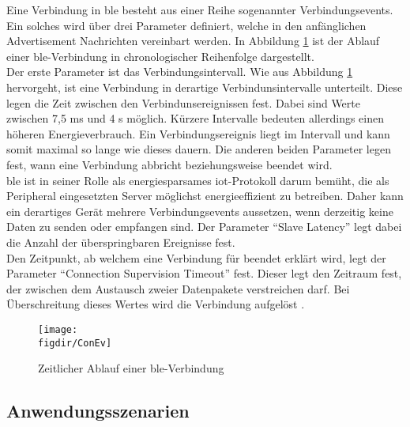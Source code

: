 \noindent Eine Verbindung in \ac{ble} besteht aus einer Reihe sogenannter Verbindungsevents. Ein solches wird über drei Parameter definiert, welche in den anfänglichen Advertisement Nachrichten vereinbart werden. In Abbildung \ref{FIG:ConEv} ist der Ablauf einer \ac{ble}-Verbindung in chronologischer Reihenfolge dargestellt.\\
\noindent Der erste Parameter ist das Verbindungsintervall. Wie aus Abbildung \ref{FIG:ConEv} hervorgeht, ist eine Verbindung in derartige Verbindunsintervalle unterteilt. Diese legen die Zeit zwischen den Verbindunsereignissen fest. Dabei sind Werte zwischen 7,5 ms und 4 s möglich. Kürzere Intervalle bedeuten allerdings einen höheren Energieverbrauch. Ein Verbindungsereignis liegt im Intervall und kann somit maximal so lange wie dieses dauern. Die anderen beiden Parameter legen fest, wann eine Verbindung abbricht beziehungsweise beendet wird.\\ 
\noindent \ac{ble} ist in seiner Rolle als energiesparsames \ac{iot}-Protokoll darum bemüht, die als Peripheral eingesetzten Server möglichst energieeffizient zu betreiben. Daher kann ein derartiges Gerät mehrere Verbindungsevents aussetzen, wenn derzeitig keine Daten zu senden oder empfangen sind. Der Parameter "`Slave Latency"' legt dabei die Anzahl der überspringbaren Ereignisse fest.\\
\noindent Den Zeitpunkt, ab welchem eine Verbindung für beendet erklärt wird, legt der Parameter "`Connection Supervision Timeout"' fest. Dieser legt den Zeitraum fest, der zwischen dem Austausch zweier Datenpakete verstreichen darf. Bei Überschreitung dieses Wertes wird die Verbindung aufgelöst \cite[Seite 22f]{Townsend14:GSB}.\\

\begin{figure}[!h]
	\centering
	\texttt{[image: \\figdir/ConEv]}
	\caption[Zeitlicher Ablauf einer \ac{ble}-Verbindung]{Zeitlicher Ablauf einer \ac{ble}-Verbindung \cite[Seite 22]{Townsend14:GSB}}
	\label{FIG:ConEv}
\end{figure}

\subsection{Anwendungsszenarien}
\label{ss:funktionsweise:anwendungen}

